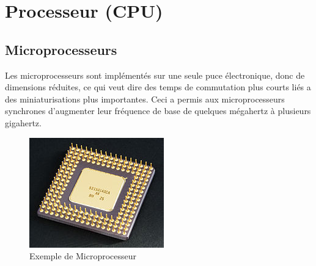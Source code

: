 \documentclass[a4paper,12pt]{article}
\begin{document}
    \newpage
    
    \tableofcontents
    \listoffigures
    \listoftables
    
    \newpage
    
    \section{Processeur (CPU)\protect\footnotemark[1]}
    
        \subsection{Microprocesseurs}
            Les microprocesseurs sont implémentés sur une seule puce électronique, donc de dimensions réduites, ce qui veut dire des temps de commutation plus courts liés a des miniaturisations plus importantes. Ceci a permis aux microprocesseurs synchrones d'augmenter leur fréquence de base de quelques mégahertz à plusieurs gigahertz. \\
    
            \begin{figure}[h!]
                \centering
                \includegraphics[scale=0.4]{Microprocesseur.jpg}
                \caption{Exemple de Microprocesseur}
                \label{fig: Exemple de Microprocesseur}
            \end{figure}
\end{document}

